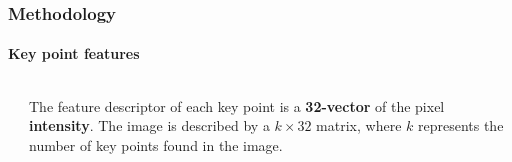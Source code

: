 \begin{frame}
	\frametitle{Methodology}
	\framesubtitle{Key point features}
	
	\Large
	
	\begin{columns}[T]
		
		\begin{center}
		\end{center}
		
		
		\vspace{0.65cm}
		
		The feature descriptor of each key point is a \textbf{32-vector} of the pixel
		\textbf{intensity}. The image is described by a $ k \times 32 $ matrix, where $ k $ represents
		the number of key points found in the image.
		
	\end{columns}
\end{frame}
